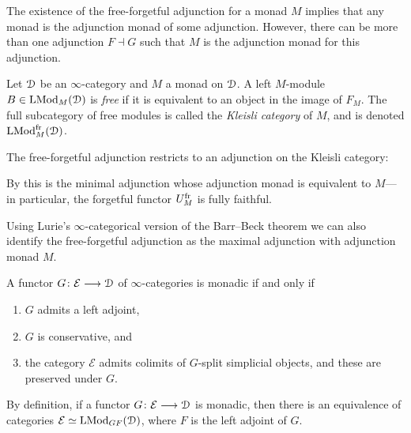 The existence of the free-forgetful adjunction for a monad $M$ implies that any monad is the adjunction monad of some adjunction. However, there can be more than one adjunction $F\dashv G$ such that $M$ is the adjunction monad for this adjunction.

\begin{definition}
    Let $\EuScript{D}$ be an $\infty$-category and $M$ a monad on $\EuScript{D}$. A left $M$-module $B\in \mathrm{LMod}_M(\EuScript{D})$ is \emph{free} if it is equivalent to an object in the image of $F_M$. The full subcategory of free modules is called the \emph{Kleisli category} of $M$, and is denoted $\mathrm{LMod}_M^{\mathrm{fr}}(\EuScript{D})$. 
\end{definition}

The free-forgetful adjunction restricts to an adjunction on the Kleisli category: 
\begin{center}
\end{center}
By \cite[1.8]{christ_2023} this is the minimal adjunction whose adjunction monad is equivalent to $M$---in particular, the forgetful functor $U_M^{\mathrm{fr}}$ is fully faithful.  

Using Lurie's $\infty$-categorical version of the Barr--Beck theorem we can also identify the free-forgetful adjunction as the maximal adjunction with adjunction monad $M$. 

\begin{theorem}
    \label{ch2:thm:Lurie-BB}
    A functor $G\colon \mathcal{E}\longrightarrow \EuScript{D}$ of $\infty$-categories is monadic if and only if 
    \begin{enumerate}
        \item $G$ admits a left adjoint,
        \item $G$ is conservative, and
        \item the category $\mathcal{E}$ admits colimits of $G$-split simplicial objects, and these are preserved under $G$. 
    \end{enumerate}
\end{theorem}

\begin{remark}
    By definition, if a functor $G\colon \mathcal{E}\longrightarrow \EuScript{D}$ is monadic, then there is an equivalence of categories $\mathcal{E}\simeq \mathrm{LMod}_{GF}(\EuScript{D})$, where $F$ is the left adjoint of $G$. 
\end{remark}

